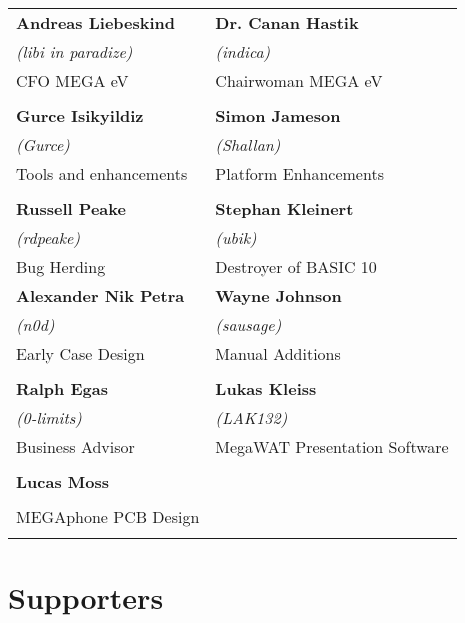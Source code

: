 \setlength{\tabcolsep}{1mm}
\begin{tabular}{p{6cm}p{6cm}}

{\large\bf Andreas Liebeskind}     & {\large\bf Dr. Canan Hastik} \\
 \textit{(libi in paradize)}       & \textit{(indica)} \\
CFO MEGA eV                        & Chairwoman MEGA eV \\
& \\
{\large\bf Gurce Isikyildiz}       & {\large\bf Simon Jameson} \\
 \textit{(Gurce)}                  &  \textit{(Shallan)} \\
Tools and enhancements             & Platform Enhancements \\
& \\
{\large\bf Russell Peake}          & {\large\bf Stephan Kleinert} \\
  \textit{(rdpeake)}               & \textit{(ubik)}        \\
Bug Herding                        & Destroyer of BASIC 10     \\
{\large\bf Alexander Nik Petra}    & {\large\bf Wayne Johnson} \\
 \textit{(n0d)}                    &  \textit{(sausage)} \\
Early Case Design                  & Manual Additions \\
& \\
{\large\bf Ralph Egas}             & {\large\bf Lukas Kleiss} \\
 \textit{(0-limits)}               & \textit{(LAK132)} \\
Business Advisor                   & MegaWAT Presentation Software \\
& \\
{\large\bf Lucas Moss}             &                           \\
                                   &                    \\
MEGAphone PCB Design               &                       \\
& \\
\end{tabular}

\newpage
\section{Supporters}

